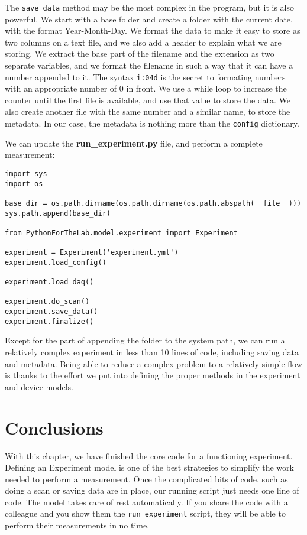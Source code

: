 The \texttt{save\_data} method may be the most complex in the program, but it is also powerful. We start with a base folder and create a folder with the current date, with the format Year-Month-Day. We format the data to make it easy to store as two columns on a text file, and we also add a header to explain what we are storing. We extract the base part of the filename and the extension as two separate variables, and we format the filename in such a way that it can have a number appended to it. The syntax \texttt{i:04d} is the secret to formating numbers with an appropriate number of $0$ in front. We use a while loop to increase the counter until the first file is available, and use that value to store the data. We also create another file with the same number and a similar name, to store the metadata. In our case, the metadata is nothing more than the \texttt{config} dictionary.


We can update the \textbf{run\_experiment.py} file, and perform a complete measurement:

\begin{verbatim}
import sys
import os

base_dir = os.path.dirname(os.path.dirname(os.path.abspath(__file__)))
sys.path.append(base_dir)

from PythonForTheLab.model.experiment import Experiment

experiment = Experiment('experiment.yml')
experiment.load_config()

experiment.load_daq()

experiment.do_scan()
experiment.save_data()
experiment.finalize()
\end{verbatim}

Except for the part of appending the folder to the system path, we can run a relatively complex experiment in less than 10 lines of code, including saving data and metadata. Being able to reduce a complex problem to a relatively simple flow is thanks to the effort we put into defining the proper methods in the experiment and device models.

\section{Conclusions}\label{sec:experiment-model-conclusions}
With this chapter, we have finished the core code for a functioning experiment. Defining an Experiment model is one of the best strategies to simplify the work needed to perform a measurement. Once the complicated bits of code, such as doing a scan or saving data are in place, our running script just needs one line of code. The model takes care of rest automatically. If you share the code with a colleague and you show them the \texttt{run\_experiment} script, they will be able to perform their measurements in no time.

